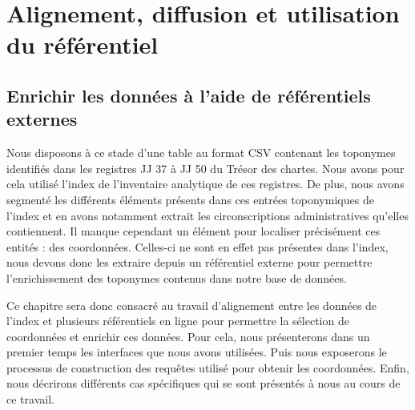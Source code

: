 \documentclass[a4paper,12pt,twoside]{book}
\makeatletter
\newcommand{\parttext}[1]{\def\@parttext{#1}}
\makeatother
\begin{document}
	\parttext{Si la constitution d'un référentiel à partir d'entrées d'index constitue l'objectif premier du stage, ce travail n'est pas suffisant pour fournir un outil pertinent afin d'étudier le contenu du Trésor des chartes. Les données constituées, pour être utiles, doivent en effet pouvoir rejoindre et compléter les différentes ontologies web déjà disponibles. Nous consacrerons donc cette troisième et dernière partie à la création de liens à partir du référentiel et à ses utilisations. L'objectif étant de l'insérer dans les connaissances générales disponibles sur les documents historiques. Pour cela, nous décrirons dans un premier chapitre le processus d'enrichissement du référentiel par son alignement avec des ontologies web. Puis nous dédierons un second chapitre à la mise à disposition du référentiel et aux liens réalisés avec les autres données du corpus. Enfin, nous consacrerons un troisième chapitre aux différents essais réalisés pour la mise en œuvre du liage d'entités.}
	
	\part{Alignement, diffusion et utilisation du référentiel}
	
	\chapter{Enrichir les données à l’aide de référentiels externes}
	
	Nous disposons à ce stade d'une table au format CSV contenant les toponymes identifiés dans les registres JJ 37 à JJ 50 du Trésor des chartes. Nous avons pour cela utilisé l'index de l'inventaire analytique de ces registres. De plus, nous avons segmenté les différents éléments présents dans ces entrées toponymiques de l'index et en avons notamment extrait les circonscriptions administratives qu'elles contiennent. Il manque cependant un élément pour localiser précisément ces entités : des coordonnées. Celles-ci ne sont en effet pas présentes dans l'index, nous devons donc les extraire depuis un référentiel externe pour permettre l'enrichissement des toponymes contenus dans notre base de données.
	
	Ce chapitre sera donc consacré au travail d'alignement entre les données de l'index et plusieurs référentiels en ligne pour permettre la sélection de coordonnées et enrichir ces données. Pour cela, nous présenterons dans un premier temps les interfaces que nous avons utilisées. Puis nous exposerons le processus de construction des requêtes utilisé pour obtenir les coordonnées. Enfin, nous décrirons différents cas spécifiques qui se sont présentés à nous au cours de ce travail.
	
\end{document}
